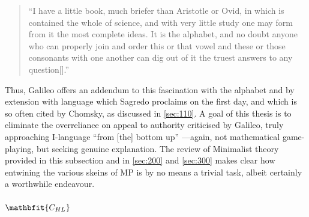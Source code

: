 \begin{quote}
``I have a little book, much briefer than Aristotle or Ovid, in which is contained the whole of science, and with very little study one may form from it the most complete ideas. It is the alphabet, and no doubt anyone who can properly join and order this or that vowel and these or those consonants with one another can dig out of it the truest answers to any question[].'' \parencite[109]{Galileo_1967}
\end{quote}
\noindent
Thus, Galileo offers an addendum to this fascination with the alphabet and by extension with language which Sagredo proclaims on the first day, and which is so often cited by Chomsky, as discussed in \autoref{sec:110}. A goal of this thesis is to eliminate the overreliance on appeal to authority criticised by Galileo, truly approaching I-language ``from [the] bottom up'' \parencite[4]{ChomskyN_2007}---again, not mathematical game-playing, but seeking genuine explanation. The review of Minimalist theory provided in this subsection and in \autoref{sec:200} and \autoref{sec:300} makes clear how entwining the various skeins of MP is by no means a trivial task, albeit certainly a worthwhile endeavour.

\subsubsection[\CHL]{$\mathbfit{\CHL}$}\label{sec:141}

